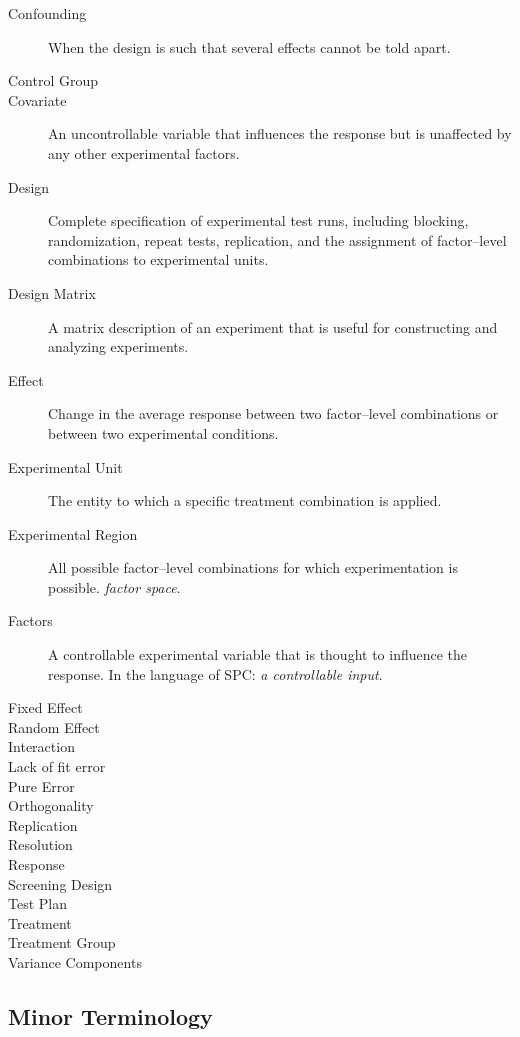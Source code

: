 \begin{description}
\item [Confounding] When the design is such that several effects cannot be told apart. 
\item [Control Group] 
\item [Covariate]  An uncontrollable variable that influences the response but is
unaffected by any other experimental factors.
\item [Design]  Complete specification of experimental test runs, including
blocking, randomization, repeat tests, replication, and the assignment of
factor–level combinations to experimental units.
\item [Design Matrix] A matrix description of an experiment that is useful for constructing and analyzing experiments.
\item [Effect]  Change in the average response between two factor–level combinations or between two experimental conditions. 
\item [Experimental Unit] The entity to which a specific treatment combination is applied.
\item [Experimental Region] All possible factor–level combinations for which experimentation is possible. \Aka \emph{factor space}.
\item [Factors]  A controllable experimental variable that is thought to influence the response. In the language of SPC: \emph{a controllable input}.
\item [Fixed Effect] 
\item [Random Effect]
\item [Interaction]
\item [Lack of fit error]
\item [Pure Error]
\item [Orthogonality]
\item [Replication]
\item [Resolution]
\item [Response]
\item [Screening Design]
\item [Test Plan]
\item [Treatment]
\item [Treatment Group]
\item [Variance Components]
\end{description}



\subsection{Minor Terminology}






